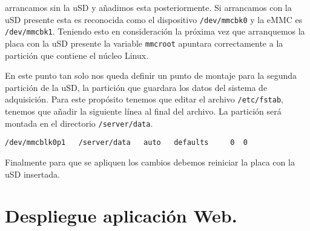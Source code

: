 		arrancamos sin la uSD y añadimos esta posteriormente. Si arrancamos con la uSD presente esta es reconocida como el dispositivo
		\texttt{/dev/mmcbk0} y la eMMC es \texttt{/dev/mmcbk1}. Teniendo esto en consideración la próxima vez que arranquemos la placa con la
		uSD presente la variable \texttt{mmcroot} apuntara correctamente a la partición que contiene el núcleo Linux.
		\par
		En este punto tan solo nos queda definir un punto de montaje para la segunda partición de la uSD, la partición que guardara los datos
		del sistema de adquisición. Para este propósito tenemos que editar el archivo \texttt{/etc/fstab}, tenemos que añadir la siguiente
		línea al final del archivo. La partición será montada en el directorio \texttt{/server/data}.
		\begin{lstlisting}[style=myFile]
/dev/mmcblk0p1   /server/data   auto   defaults     0  0
		\end{lstlisting}
		Finalmente para que se apliquen los cambios debemos reiniciar la placa con la uSD insertada.


\chapter{Despliegue aplicación Web.}
